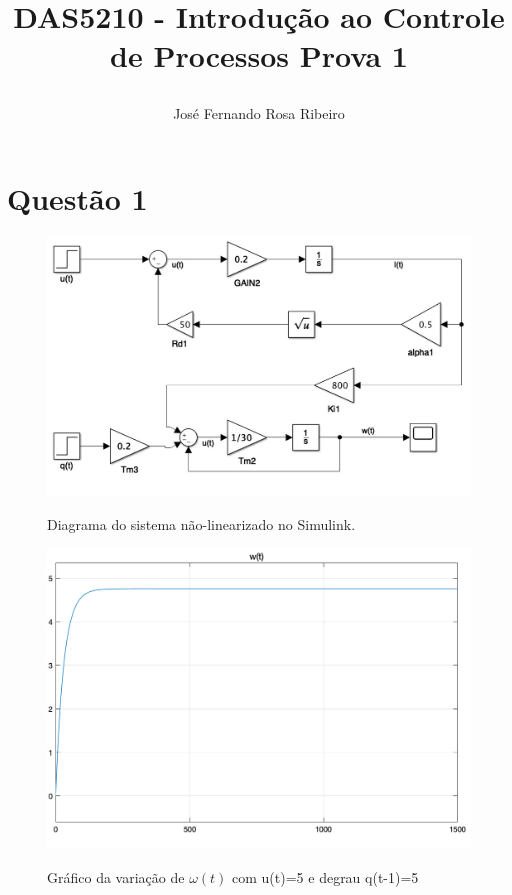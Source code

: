 \documentclass[11pt]{article}
\begin{document}
\author{
	José Fernando Rosa Ribeiro
}
\title{DAS5210 - Introdução ao Controle de Processos
	\newline
	\newline
	\large Prova 1
	\date{\vspace{-5ex}}}
\maketitle
\setcounter{secnumdepth}{0}

\section{Questão 1}
\begin{figure}[H]
	\centering
	{\includegraphics[width=\textwidth]
		{assets/q1_non_linearized_schema.jpg}}
	\caption{Diagrama do sistema não-linearizado no Simulink.}
\end{figure}

\begin{figure}[H]
	\centering
	{\includegraphics[width=\textwidth]
		{assets/q1_u(t)_3_q(t)_0to5.png}}
	\caption{Gráfico da variação de $\omega(t)$ com u(t)=5 e degrau q(t-1)=5}
\end{figure}
\end{document}
